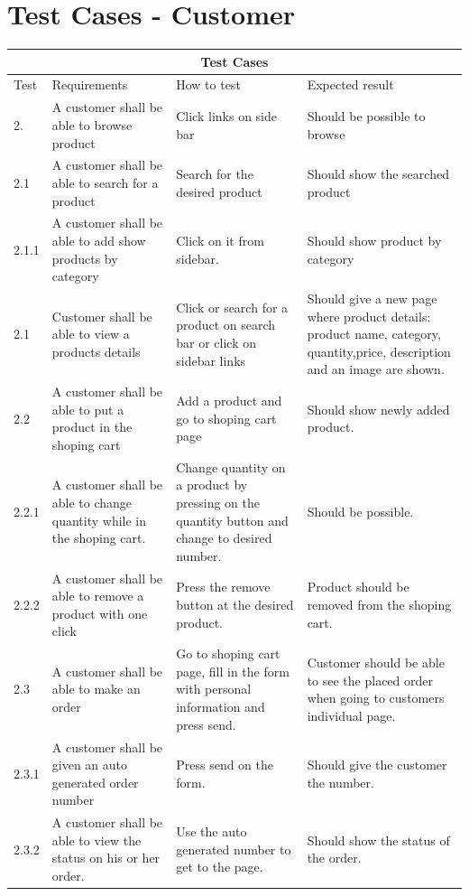 \documentclass[a4paper,12pt]{article}
\begin{document}
	\section{Test Cases - Customer}
\begin{tabular}{ |p{1cm}||p{4cm}|p{4cm}|p{4cm}|  }
	\hline
	\multicolumn{4}{|c|}{Test Cases} \\
	\hline
	Test& Requirements &How to test&Expected result\\
	\hline

	2.    &A customer shall be able to browse product  & Click links on side bar & Should be possible to browse\\
	\hline
	2.1&  A customer shall be able to search for a product  & Search for the desired product&Should show the searched product\\
	\hline
	2.1.1& A customer shall be able to add show products by category  & Click on it from sidebar.   & Should show product by category \\
	\hline
	2.1 & Customer shall be able to view a products details  &Click or search for a product on search bar or click on sidebar links &Should give a new page where product details: product name, category, quantity,price, description and an image are shown. \\
	\hline
	2.2 & A customer shall be able to put a product in the shoping cart & Add a product and go to shoping cart page & Should show newly added product. \\
	\hline
	2.2.1 & A customer shall be able to change quantity while in the shoping cart. & Change quantity on a product by pressing on the quantity button and change to desired number. & Should be possible. \\
	\hline
	2.2.2 & A customer shall be able to remove a product with one click& Press the remove button at the desired product. & Product should be removed from the shoping cart. \\
	\hline
	2.3 & A customer shall be able to make an order & Go to shoping cart page, fill in the form with personal information and press send. & Customer should be able to see the placed order when going to customers individual page.\\
	\hline
	2.3.1 & A customer shall be given an auto generated order number & Press send on the form. & Should give the customer the number. \\
	
	\hline
	2.3.2 & A customer shall be able to view the status on his or her order. & Use the auto generated number to get to the page. & Should show the status of the order. \\
	\hline

	
	
	
\end{tabular}
\end{document}

